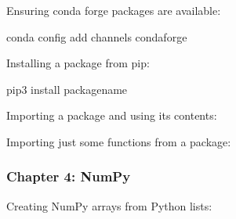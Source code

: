 \documentclass[letterpaper,10pt,english]{jupyterBook}
\begin{document}
\sphinxAtStartPar
Ensuring conda forge packages are available:

\begin{sphinxVerbatim}[commandchars=\\\{\}]
conda config \PYGZhy{}\PYGZhy{}add channels conda\PYGZhy{}forge
\end{sphinxVerbatim}

\sphinxAtStartPar
Installing a package from pip:

\begin{sphinxVerbatim}[commandchars=\\\{\}]
pip3 install package\PYGZus{}name
\end{sphinxVerbatim}

\sphinxAtStartPar
Importing a package and using its contents:

\begin{sphinxVerbatim}[commandchars=\\\{\}]
 
  
   
  
\end{sphinxVerbatim}

\sphinxAtStartPar
Importing just some functions from a package:

\begin{sphinxVerbatim}[commandchars=\\\{\}]
    
  
            
\end{sphinxVerbatim}


\subsubsection{Chapter 4: NumPy}
\label{\detokenize{big-cheat-sheet:chapter-4-numpy}}
\sphinxAtStartPar
Creating NumPy arrays from Python lists:

\begin{sphinxVerbatim}[commandchars=\\\{\}]
   
   \PYG{p}{[}      \PYG{p}{]} 
\end{sphinxVerbatim}
\end{document}
